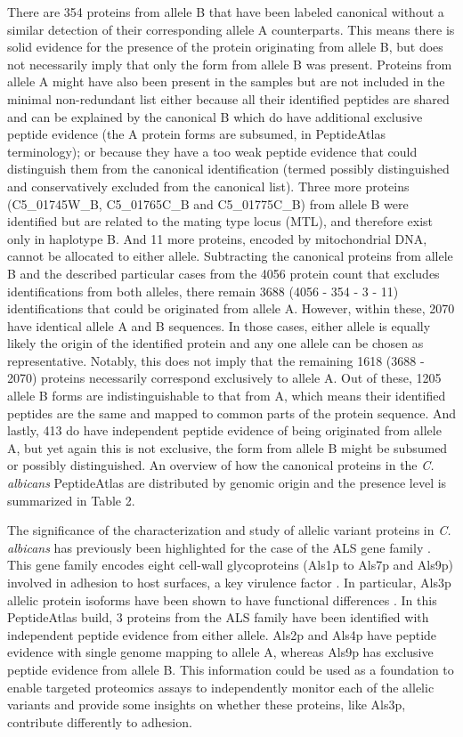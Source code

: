 There are 354 proteins from allele B that have been labeled canonical without a similar
detection of their corresponding allele A counterparts. This means there is solid evidence for
the presence of the protein originating from allele B, but does not necessarily imply that only
the form from allele B was present. Proteins from allele A might have also been present in
the samples but are not included in the minimal non-redundant list either because all their
identified peptides are shared and can be explained by the canonical B which do have
additional exclusive peptide evidence (the A protein forms are subsumed, in PeptideAtlas
terminology); or because they have a too weak peptide evidence that could distinguish them
from the canonical identification (termed possibly distinguished and conservatively excluded
from the canonical list).
Three more proteins (C5\_01745W\_B, C5\_01765C\_B and C5\_01775C\_B) from allele B were
identified but are related to the mating type locus (MTL), and therefore exist only in haplotype
B. And 11 more proteins, encoded by mitochondrial DNA, cannot be allocated to either allele.
Subtracting the canonical proteins from allele B and the described particular cases from the
4056 protein count that excludes identifications from both alleles, there remain 3688 (4056 -
354 - 3 - 11) identifications that could be originated from allele A. However, within these,
2070 have identical allele A and B sequences. In those cases, either allele is equally likely
the origin of the identified protein and any one allele can be chosen as representative.
Notably, this does not imply that the remaining 1618 (3688 - 2070) proteins necessarily
correspond exclusively to allele A. Out of these, 1205 allele B forms are indistinguishable to
that from A, which means their identified peptides are the same and mapped to common
parts of the protein sequence. And lastly, 413 do have independent peptide evidence of being
originated from allele A, but yet again this is not exclusive, the form from allele B might be
subsumed or possibly distinguished. An overview of how the canonical proteins in the
\textit{C. albicans} PeptideAtlas are distributed by genomic origin and the presence level is
summarized in Table 2.

The significance of the characterization and study of allelic variant proteins in 
\textit{C. albicans} has previously been highlighted for the case of the ALS gene family \citep{Hoyer2008}.
This gene family encodes eight cell-wall glycoproteins (Als1p to Als7p and Als9p) involved in
adhesion to host surfaces, a key virulence factor \citep{DeGroot2013}. In particular, Als3p allelic protein
isoforms have been shown to have functional differences \citep{Oh2005}. In this PeptideAtlas build, 
3 proteins from the ALS family have been identified with independent peptide evidence from
either allele. Als2p and Als4p have peptide evidence with single genome mapping to allele A,
whereas Als9p has exclusive peptide evidence from allele B. This information could be used as
a foundation to enable targeted proteomics assays to independently monitor each of the allelic
variants and  provide some insights on whether these proteins, like Als3p, contribute 
differently to adhesion.


